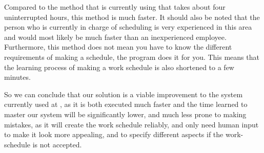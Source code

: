 Compared to the method that \siemens is currently using that takes about four uninterrupted hours, this method is much faster. It should also be noted that the person who is currently in charge of scheduling is very experienced in this area and would most likely be much faster than an inexperienced employee. Furthermore, this method does not mean you have to know the different requirements of making a schedule, the program does it for you. This means that the learning process of making a work schedule is also shortened to a few minutes.

So we can conclude that our solution is a viable improvement to the system currently used at \siemens, as it is both executed much faster and the time learned to master our system will be significantly lower, and much less prone to making mistakes, as it will create the work schedule reliably, and only need human input to make it look more appealing, and to specify different aspects if the work-schedule is not accepted.

